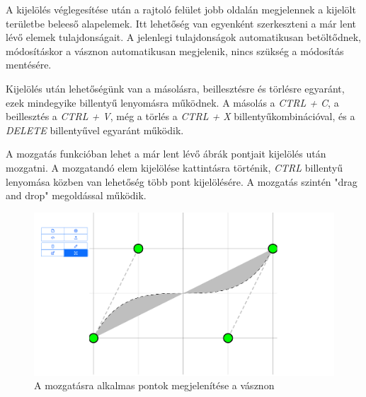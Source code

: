 A kijelölés véglegesítése után a rajtoló felület jobb oldalán megjelennek a kijelölt területbe beleeső alapelemek. Itt lehetőség van egyenként szerkeszteni a már lent lévő elemek tulajdonságait. A jelenlegi tulajdonságok automatikusan betöltődnek, módosításkor a vásznon automatikusan megjelenik, nincs szükség a módosítás mentésére.

Kijelölés után lehetőségünk van a másolásra, beillesztésre és törlésre egyaránt, ezek mindegyike billentyű lenyomásra működnek. A másolás a  \textit{CTRL + C}, a beillesztés a \textit{CTRL + V}, még a törlés a \textit{CTRL + X} billentyűkombinációval, és a \textit{DELETE} billentyűvel egyaránt működik.


A mozgatás funkcióban lehet a már lent lévő ábrák pontjait kijelölés után mozgatni. A mozgatandó elem kijelölése kattintásra történik, \textit{CTRL} billentyű lenyomása közben van lehetőség több pont kijelölésére. A mozgatás szintén "drag and drop" megoldással működik.

\begin{figure}[!h]
	\label{fig:move}
	\centering
	\includegraphics[width=\textwidth]{images/editor_move.png}
	\caption{A mozgatásra alkalmas pontok megjelenítése a vásznon}
\end{figure}


